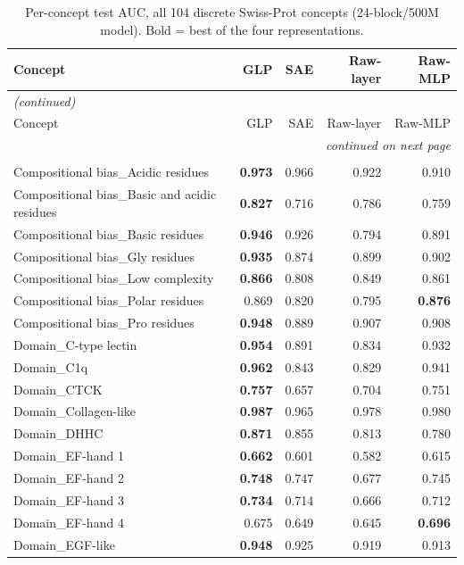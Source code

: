 \documentclass{article}
\begin{document}
\begin{longtable}{p{6.0cm}rrrr}
\caption{Per-concept test AUC, all 104 discrete Swiss-Prot concepts (24-block/500M model). Bold = best of the four representations.} \label{tab:app-discrete} \\
\toprule
Concept & GLP & SAE & Raw-layer & Raw-MLP \\
\midrule
\endfirsthead
\multicolumn{5}{l}{\textit{(continued)}} \\
\toprule
Concept & GLP & SAE & Raw-layer & Raw-MLP \\
\midrule
\endhead
\midrule \multicolumn{5}{r}{\textit{continued on next page}} \\
\endfoot
\bottomrule
\endlastfoot
\multicolumn{5}{l}{\textbf{Domain / motif (n=86)}} \\
Compositional bias\_Acidic residues & \textbf{0.973} & 0.966 & 0.922 & 0.910 \\
Compositional bias\_Basic and acidic residues & \textbf{0.827} & 0.716 & 0.786 & 0.759 \\
Compositional bias\_Basic residues & \textbf{0.946} & 0.926 & 0.794 & 0.891 \\
Compositional bias\_Gly residues & \textbf{0.935} & 0.874 & 0.899 & 0.902 \\
Compositional bias\_Low complexity & \textbf{0.866} & 0.808 & 0.849 & 0.861 \\
Compositional bias\_Polar residues & 0.869 & 0.820 & 0.795 & \textbf{0.876} \\
Compositional bias\_Pro residues & \textbf{0.948} & 0.889 & 0.907 & 0.908 \\
Domain\_C-type lectin & \textbf{0.954} & 0.891 & 0.834 & 0.932 \\
Domain\_C1q & \textbf{0.962} & 0.843 & 0.829 & 0.941 \\
Domain\_CTCK & \textbf{0.757} & 0.657 & 0.704 & 0.751 \\
Domain\_Collagen-like & \textbf{0.987} & 0.965 & 0.978 & 0.980 \\
Domain\_DHHC & \textbf{0.871} & 0.855 & 0.813 & 0.780 \\
Domain\_EF-hand 1 & \textbf{0.662} & 0.601 & 0.582 & 0.615 \\
Domain\_EF-hand 2 & \textbf{0.748} & 0.747 & 0.677 & 0.745 \\
Domain\_EF-hand 3 & \textbf{0.734} & 0.714 & 0.666 & 0.712 \\
Domain\_EF-hand 4 & 0.675 & 0.649 & 0.645 & \textbf{0.696} \\
Domain\_EGF-like & \textbf{0.948} & 0.925 & 0.919 & 0.913 \\

\end{longtable}
\end{document}
